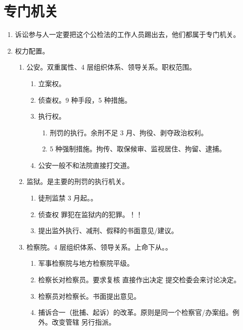 \section{专门机关}
\begin{enumerate}
  \item 诉讼参与人一定要把这个公检法的工作人员踢出去，他们都属于专门机关。
  \item 权力配置。
        \begin{enumerate}
          \item 公安。双重属性、4 层组织体系、领导关系。职权范围。
                \begin{enumerate}
                  \item 立案权。
                  \item 侦查权。9 种手段，5 种措施。
                  \item 执行权。
                        \begin{enumerate}
                          \item 刑罚的执行。余刑不足 3 月、拘役、剥夺政治权利。
                          \item 5 种强制措施。拘传、取保候审、监视居住、拘留、逮捕。
                        \end{enumerate}
                  \item 公安一般不和法院直接打交道。
                \end{enumerate}
          \item 监狱。是主要的刑罚的执行机关。
                \begin{enumerate}
                  \item 徒刑监禁 3 月起。。
                  \item 侦查权 \yjt 罪犯在监狱内的犯罪。！！
                  \item 提出监外执行、减刑、假释的书面意见/建议。
                \end{enumerate}
          \item 检察院。4 层组织体系、领导关系。上命下从。。
                \begin{enumerate}
                  \item 军事检察院与地方检察院平级。
                  \item 检察长对检察员。要求复核 \hz 直接作出决定 \hz 提交检委会来讨论决定。
                  \item 检察员对检察长。书面提出意见。
                  \item 捕诉合一（批捕、起诉）的改革。原则是同一个检察官/办案组。例外。改变管辖 \hz 另行指派。

\end{enumerate}
\end{enumerate}
\end{enumerate}
